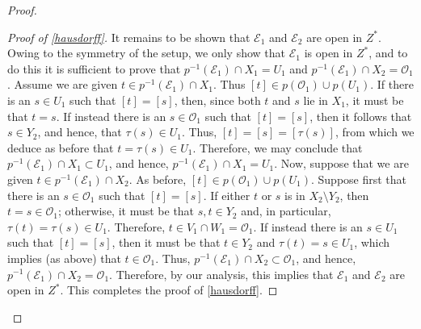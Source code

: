 \documentclass[12pt]{amsart}
\numberwithin{equation}{section}
\theoremstyle{definition}
\theoremstyle{remark}
\begin{document}
\begin{proof}
\begin{proof}[Proof of \autoref{hausdorff}]
		It remains to be shown that $\mathcal{E}_{1}$ and $\mathcal{E}_{2}$ are open in $Z^{*}$. Owing to the symmetry of the setup, we only show that $\mathcal{E}_{1}$ is open in $Z^{*}$, and to do this it is sufficient to prove that $p^{-1}(\mathcal{E}_{1})\cap X_{1}=U_{1}$ and $p^{-1}(\mathcal{E}_{1})\cap X_{2}=\mathcal{O}_{1}$. Assume we are given $t\in p^{-1}(\mathcal{E}_{1})\cap X_{1}$. Thus $[t]\in p(\mathcal{O}_{1})\cup p(U_{1})$. If there is an $s\in U_{1}$ such that $[t]=[s]$, then, since both $t$ and $s$ lie in $X_{1}$, it must be that $t=s$. If instead there is an $s\in\mathcal{O}_{1}$ such that $[t]=[s]$, then it follows that $s\in Y_{2}$, and hence, that $\tau(s)\in U_{1}$. Thus, $[t]=[s]=[\tau(s)]$, from which we deduce as before that $t=\tau(s)\in U_{1}$. Therefore, we may conclude that $p^{-1}(\mathcal{E}_{1})\cap X_{1}\subset U_{1}$, and hence, $p^{-1}(\mathcal{E}_{1})\cap X_{1}=U_{1}$. Now, suppose that we are given $t\in p^{-1}(\mathcal{E}_{1})\cap X_{2}$. As before, $[t]\in p(\mathcal{O}_{1})\cup p(U_{1})$. Suppose first that there is an $s\in\mathcal{O}_{1}$ such that $[t]=[s]$. If either $t$ or $s$ is in $X_{2}\setminus Y_{2}$, then $t=s\in \mathcal{O}_{1}$; otherwise, it must be that $s,t\in Y_{2}$ and, in particular, $\tau(t)=\tau(s)\in U_{1}$. Therefore, $t\in V_{1}\cap W_{1}=\mathcal{O}_{1}$. If instead there is an $s\in U_{1}$ such that $[t]=[s]$, then it must be that $t\in Y_{2}$ and $\tau(t)=s\in U_{1}$, which  implies (as above) that $t\in\mathcal{O}_{1}$. Thus, $p^{-1}(\mathcal{E}_{1})\cap X_{2}\subset \mathcal{O}_{1}$, and hence, $p^{-1}(\mathcal{E}_{1})\cap X_{2}=\mathcal{O}_{1}$. Therefore, by our analysis, this implies that $\mathcal{E}_{1}$ and $\mathcal{E}_{2}$ are open in $Z^{*}$. This completes the proof of \autoref{hausdorff}.  
	\end{proof}


\end{proof}
\end{document}

